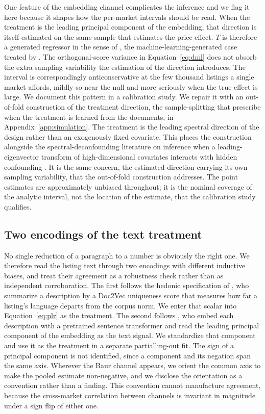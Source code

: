 One feature of the embedding channel complicates the inference and we flag it here
because it shapes how the per-market intervals should be read. When the treatment
is the leading principal component of the embedding, that direction is itself
estimated on the same sample that estimates the price effect. $T$ is therefore a
generated regressor in the sense of \citet{pagan1984econometric}, the
machine-learning-generated case treated by \citet{battaglia2024inference}. The
orthogonal-score variance in Equation~\eqref{eq:dml} does not absorb the extra
sampling variability the estimation of the direction introduces. The interval is
correspondingly anticonservative at the few thousand listings a single market
affords, mildly so near the null and more seriously when the true effect is large.
We document this pattern in a calibration study. We repair it with an out-of-fold
construction of the treatment direction, the sample-splitting that
\citet{egami2022texts} prescribe when the treatment is learned from the documents,
in Appendix~\ref{app:simulation}. The treatment is the leading spectral direction
of the design rather than an exogenously fixed covariate. This places the
construction alongside the spectral-deconfounding literature on inference when a
leading-eigenvector transform of high-dimensional covariates interacts with hidden
confounding \citep{cevid2020spectral, guo2022doubly}. It is the same concern, the
estimated direction carrying its own sampling variability, that the out-of-fold
construction addresses. The point estimates are
approximately unbiased throughout; it is the nominal coverage of the analytic
interval, not the location of the estimate, that the calibration study qualifies.

\subsection{Two encodings of the text treatment}
\label{sec:methods-channels}

No single reduction of a paragraph to a number is obviously the right one. We
therefore read the listing text through two encodings with different inductive
biases, and treat their agreement as a robustness check rather than as independent
corroboration. The first follows the hedonic specification of
\citet{shen2021information}, who summarize a description by a Doc2Vec uniqueness
score that measures how far a listing's language departs from the corpus norm. We
enter that scalar into Equation~\eqref{eq:plr} as the treatment. The second
follows \citet{baur2023automated}, who embed each description with a pretrained
sentence transformer and read the leading principal component of the embedding as
the text signal. We standardize that component and use it as the treatment in a
separate partialling-out fit. The sign of a principal component is not identified,
since a component and its negation span the same axis. Wherever the Baur channel
appears, we orient the common axis to make the pooled estimate non-negative, and
we disclose the orientation as a convention rather than a finding. This convention
cannot manufacture agreement, because the cross-market correlation between channels
is invariant in magnitude under a sign flip of either one.

